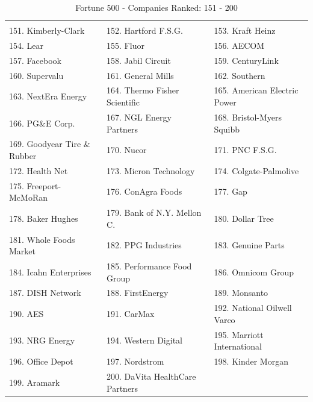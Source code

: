 \documentclass{article}
\begin{document}
\begin{table}[H]
\centering
\caption{Fortune 500 - Companies Ranked: 151 - 200}
\begin{tabular}{lll}
\hline
 \\ 151. Kimberly-Clark 
&  152. Hartford F.S.G. 
&  153. Kraft Heinz 
\\ 154. Lear 
&  155. Fluor 
&  156. AECOM 
\\ 157. Facebook 
&  158. Jabil Circuit 
&  159. CenturyLink 
\\ 160. Supervalu 
&  161. General Mills 
&  162. Southern 
\\ 163. NextEra Energy 
&  164. Thermo Fisher Scientific 
&  165. American Electric Power 
\\ 166. PG\&E Corp. 
&  167. NGL Energy Partners 
&  168. Bristol-Myers Squibb 
\\ 169. Goodyear Tire \& Rubber 
&  170. Nucor 
&  171. PNC F.S.G. 
\\ 172. Health Net 
&  173. Micron Technology 
&  174. Colgate-Palmolive 
\\ 175. Freeport-McMoRan 
&  176. ConAgra Foods 
&  177. Gap 
\\ 178. Baker Hughes 
&  179. Bank of N.Y. Mellon C. 
&  180. Dollar Tree 
\\ 181. Whole Foods Market 
&  182. PPG Industries 
&  183. Genuine Parts 
\\ 184. Icahn Enterprises 
&  185. Performance Food Group 
&  186. Omnicom Group 
\\ 187. DISH Network 
&  188. FirstEnergy 
&  189. Monsanto 
\\ 190. AES 
&  191. CarMax 
&  192. National Oilwell Varco 
\\ 193. NRG Energy 
&  194. Western Digital 
&  195. Marriott International 
\\ 196. Office Depot 
&  197. Nordstrom 
&  198. Kinder Morgan 
\\ 199. Aramark 
&  200. DaVita HealthCare Partners 
&   
 \\ \hline
\end{tabular}
\end{table}
\end{document}
